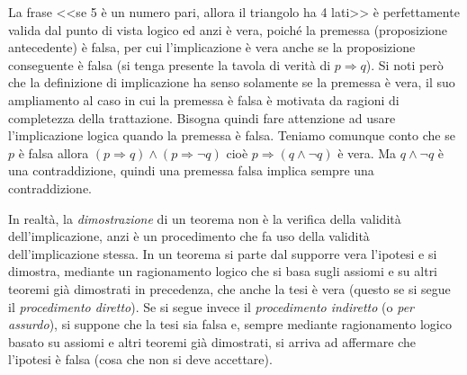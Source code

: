 La frase <<se 5 è un numero pari, allora il triangolo ha 4 lati>> è 
perfettamente valida dal punto di vista logico ed anzi è vera, poiché 
la premessa (proposizione antecedente) è falsa, per cui 
l'implicazione è vera anche se la proposizione conseguente è falsa (si 
tenga presente la tavola di verità di \(p\Rightarrow q\)).
Si noti però che la definizione di implicazione ha senso solamente se 
la premessa è vera, il suo ampliamento al caso in cui la premessa è 
falsa è motivata da ragioni di completezza della trattazione. Bisogna 
quindi fare attenzione ad usare l'implicazione logica quando la 
premessa è falsa. Teniamo comunque conto che se \(p\) è falsa allora 
\((p\Rightarrow q)\wedge(p\Rightarrow \neg q)\) cioè \(p\Rightarrow 
(q\wedge \neg q)\) è vera. Ma  \(q\wedge \neg q\) è una contraddizione, 
quindi una premessa falsa implica sempre una contraddizione.

In realtà, la \emph{dimostrazione} di un teorema non è la verifica 
della validità dell'implicazione, anzi è un procedimento che fa uso 
della validità dell'implicazione stessa. In un teorema si parte dal 
supporre vera l'ipotesi e si dimostra, mediante un ragionamento 
logico che si basa sugli assiomi e su altri teoremi già dimostrati in 
precedenza, che anche la tesi è vera (questo se si segue il 
\emph{procedimento diretto}). Se si segue invece il 
\emph{procedimento indiretto} (o \emph{per assurdo}), si suppone che 
la tesi sia falsa e, sempre mediante ragionamento logico basato su 
assiomi e altri teoremi già dimostrati, si arriva ad affermare che 
l'ipotesi è falsa (cosa che non si deve accettare).

